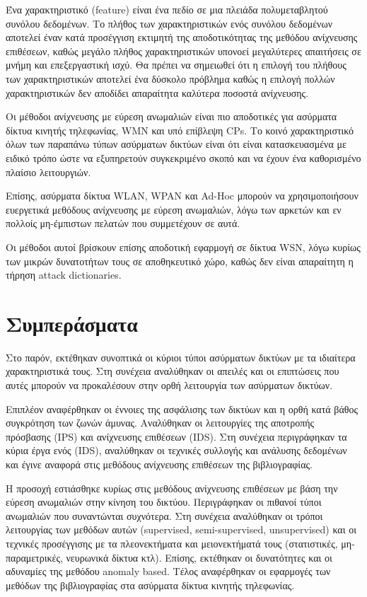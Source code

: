 \documentclass[12pt]{report}
\begin{document}
Ένα χαρακτηριστικό (\textlatin{feature}) είναι ένα πεδίο σε μια πλειάδα πολυμεταβλητού συνόλου δεδομένων. Το πλήθος των χαρακτηριστικών ενός συνόλου δεδομένων αποτελεί έναν κατά προσέγγιση εκτιμητή της αποδοτικότητας της μεθόδου ανίχνευσης επιθέσεων, καθώς μεγάλο πλήθος χαρακτηριστικών υπονοεί μεγαλύτερες απαιτήσεις σε μνήμη και επεξεργαστική ισχύ. Θα πρέπει να σημειωθεί ότι η επιλογή του πλήθους των χαρακτηριστικών αποτελεί ένα δύσκολο πρόβλημα καθώς η επιλογή πολλών χαρακτηριστικών δεν αποδίδει απαραίτητα καλύτερα ποσοστά ανίχνευσης. 

Οι μέθοδοι ανίχνευσης με εύρεση ανωμαλιών είναι πιο αποδοτικές για ασύρματα δίκτυα κινητής τηλεφωνίας, \textlatin{WMN} και υπό επίβλεψη \textlatin{CPs}. Το κοινό χαρακτηριστικό όλων των παραπάνω τύπων ασύρματων δικτύων είναι ότι είναι κατασκευασμένα με ειδικό τρόπο ώστε να εξυπηρετούν συγκεκριμένο σκοπό και να έχουν ένα καθορισμένο πλαίσιο λειτουργιών.

Επίσης, ασύρματα δίκτυα \textlatin{WLAN, WPAN} και \textlatin{Ad-Hoc} μπορούν να χρησιμοποιήσουν ευεργετικά μεθόδους ανίχνευσης με εύρεση ανωμαλιών, λόγω των αρκετών και εν πολλοίς μη-έμπιστων πελατών που συμμετέχουν σε αυτά.

Οι μέθοδοι αυτοί βρίσκουν επίσης αποδοτική εφαρμογή σε δίκτυα \textlatin{WSN}, λόγω κυρίως των μικρών δυνατοτήτων τους σε αποθηκευτικό χώρο, καθώς δεν είναι απαραίτητη η τήρηση \textlatin{attack dictionaries}.

\chapter{Συμπεράσματα}
Στο παρόν, εκτέθηκαν συνοπτικά οι κύριοι τύποι ασύρματων δικτύων με τα ιδιαίτερα χαρακτηριστικά τους. Στη συνέχεια αναλύθηκαν οι απειλές και οι επιπτώσεις που αυτές μπορούν να προκαλέσουν στην ορθή λειτουργία των ασύρματων δικτύων.

Επιπλέον αναφέρθηκαν οι έννοιες της ασφάλισης των δικτύων και η ορθή κατά βάθος συγκρότηση των ζωνών άμυνας. Αναλύθηκαν οι λειτουργίες της αποτροπής πρόσβασης (\textlatin{IPS}) και ανίχνευσης επιθέσεων (\textlatin{IDS}). Στη συνέχεια περιγράφηκαν τα κύρια έργα ενός (\textlatin{IDS}), αναλύθηκαν οι τεχνικές συλλογής και ανάλυσης δεδομένων και έγινε αναφορά στις μεθόδους ανίχνευσης επιθέσεων της βιβλιογραφίας.

Η προσοχή εστιάσθηκε κυρίως στις μεθόδους ανίχνευσης επιθέσεων με βάση την εύρεση ανωμαλιών στην κίνηση του δικτύου. Περιγράφηκαν οι πιθανοί τύποι ανωμαλιών που συναντώνται συχνότερα. Στη συνέχεια αναλύθηκαν οι  τρόποι λειτουργίας των μεθόδων αυτών (\textlatin{supervised, semi-supervised, unsupervised}) και οι τεχνικές προσέγγισης με τα πλεονεκτήματα και μειονεκτήματά τους (στατιστικές, μη-παραμετρικές, νευρωνικά δίκτυα κτλ). Επίσης, εκτέθηκαν οι δυνατότητες και οι αδυναμίες της μεθόδου \textlatin{anomaly based}. Τέλος αναφέρθηκαν οι εφαρμογές των μεθόδων της βιβλιογραφίας στα ασύρματα δίκτυα κινητής τηλεφωνίας.
\end{document}
